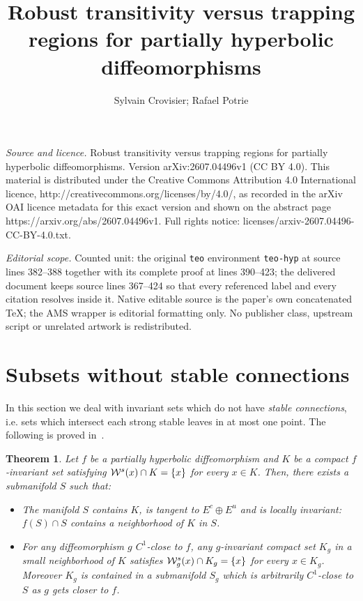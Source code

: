 \documentclass[10pt,a4paper]{amsart}
\numberwithin{equation}{section}     %
\newtheorem{teo}{Theorem}[section]
\begin{document}
\title[Robust transitivity versus trapping regions for partially hy]{Robust transitivity versus trapping regions for partially hyperbolic diffeomorphisms}
\author{Sylvain Crovisier; Rafael Potrie}
\date{}
\maketitle
\noindent\emph{Source and licence.} Robust transitivity versus trapping regions for partially hyperbolic diffeomorphisms. Version arXiv:2607.04496v1 (CC BY 4.0). This material is distributed under the Creative Commons Attribution 4.0 International licence, http://creativecommons.org/licenses/by/4.0/, as recorded in the arXiv OAI licence metadata for this exact version and shown on the abstract page https://arxiv.org/abs/2607.04496v1. Full rights notice: licenses/arxiv-2607.04496-CC-BY-4.0.txt.\par\smallskip
\noindent\textit{Editorial scope.} Counted unit: the original \texttt{teo} environment \texttt{teo-hyp} at source lines 382--388 together with its complete proof at lines 390--423; the delivered document keeps source lines 367--424 so that every referenced label and every citation resolves inside it. Native editable source is the paper's own concatenated TeX; the AMS wrapper is editorial formatting only. No publisher class, upstream script or unrelated artwork is redistributed.
\section{Subsets without stable connections}\label{s.surface} 

In this section we deal with invariant sets which do not have \emph{stable connections}, i.e. sets which intersect each strong stable leaves in at most one point. The following is proved in~\cite{BC-Center}.
\begin{teo}\label{teo-surface}
Let $f$ be a partially hyperbolic diffeomorphism and $K$ be a compact $f$-invariant set satisfying $\mathcal{W}^s(x) \cap K = \{x\}$ for every $x \in K$. Then, there exists a submanifold $S$ such that:
\begin{itemize}
\item[--] The manifold $S$ contains $K$, is tangent to $E^{c}\oplus E^u$
and is locally invariant: $f(S)\cap S$ contains a neighborhood of $K$ in $S$.
\item[--] For any diffeomorphism $g$ $C^1$-close to $f$, any $g$-invariant compact set $K_g$ in a small neighborhood of $K$ satisfies $\mathcal{W}^s_g(x) \cap K_g = \{x\}$ for every $x \in K_g$. Moreover $K_g$ is contained in
a submanifold $S_g$ which is arbitrarily $C^1$-close to $S$ as $g$ gets closer to $f$.
\end{itemize}
\end{teo}
\end{document}
